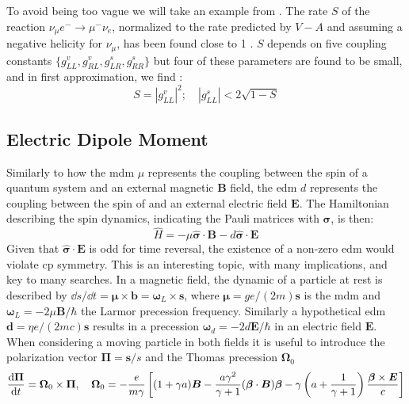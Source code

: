 \begin{refsection}
        To avoid being too vague we will take an example from \cite{PSI:review:2021}. 
        The rate $S$ of the reaction $\nu_\mu e^-\rightarrow \mu^-\nu_e$, normalized to the rate predicted by $V-A$ and assuming a negative helicity for $\nu_\mu$, has been found close to 1 \cite{17}.
        $S$ depends on five coupling constants $\{g^v_{LL},g^v_{RL},g^s_{LR},g^s_{RR}\}$ but four of these parameters are found to be small, and in first approximation, we find \cite{7}:
        \begin{equation}
            S=|g^v_{LL}|^2; \quad |g^s_{LL}|<2\sqrt{1-S}
        \end{equation}
    
    \subsection{Electric Dipole Moment}
        \label{intro:edm}
        Similarly to how the \gls{mdm} $\mu$ represents the coupling between the spin of a quantum system and an external magnetic $\bm{B}$ field, the \gls{edm} $d$ represents the coupling between the spin of and an external electric field $\bm{E}$.
        The Hamiltonian describing the spin dynamics, indicating the Pauli matrices with $\bm{\sigma}$, is then:
        \begin{equation}
            \hat{H} = -\mu\bm{\hat{\sigma}\cdot B}-d\bm{\hat{\sigma}\cdot E}
        \end{equation}
        Given that $\bm{\hat{\sigma}\cdot E}$ is odd for time reversal, the existence of a non-zero \gls{edm} would violate \gls{cp} symmetry. 
        This is an interesting topic, with many implications, and key to many searches. 
        In a magnetic field, the dynamic of a particle at rest is described by $\dd s/\dd t=\bm{\mu}\times\bm{b} = \bm{\omega}_L\times\bm{s}$, where $\bm{\mu}=ge/(2m)\bm{s}$ is the \gls{mdm} and $\bm{\omega}_L=-2\mu\bm{B}/\hbar$ the Larmor precession frequency.
        Similarly a hypothetical \gls{edm} $\bm{d}=\eta e/(2mc)\bm{s}$ results in a precession $\bm{\omega}_d=-2d\bm{E}/\hbar$ in an electric field $\bm{E}$.
    When considering a moving particle in both fields it is useful to introduce the polarization vector $\bm{\Pi}=\bm{s}/s$ and the Thomas precession $\bm{\Omega}_0$
    \begin{equation}
        \dv{\bm{\Pi}}{t}=\bm{\Omega}_0 \times \bm{\Pi}, \quad
        \bm{\Omega}_0 = -\frac{e}{m\gamma} \left[ (1+\gamma a)\bm{B}-\frac{a\gamma^2}{\gamma+1}(\bm{\beta}\cdot\bm{B})\bm{\beta}-\gamma \left( a+\frac{1}{\gamma+1} \right) \frac{\bm{\beta}\times \bm{E}}{c} \right]

\end{equation}
\end{refsection}
